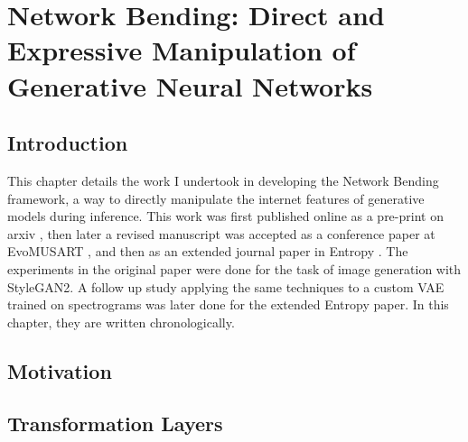 \chapter{Network Bending: Direct and Expressive Manipulation of Generative Neural Networks}
\label{ch:net_bend}

\section{Introduction}

This chapter details the work I undertook in developing the Network Bending framework, a way to directly manipulate the internet features of generative models during inference. This work was first published online as a pre-print on arxiv \citep{broad2020network}, then later a revised manuscript was accepted as a conference paper at EvoMUSART \citep{broad2021network}, and then as an extended journal paper in Entropy \citep{broad2022network}.
The experiments in the original paper were done for the task of image generation with StyleGAN2. 
A follow up study applying the same techniques to a custom VAE trained on spectrograms was later done for the extended Entropy paper. 
In this chapter, they are written chronologically.

\section{Motivation}

\section{Transformation Layers}


